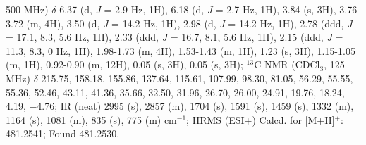 500 MHz) $\delta$ 6.37 (d, \textit{J} = 2.9 Hz, 1H), 6.18 (d, \textit{J} = 2.7 Hz, 1H), 3.84 (s, 3H), 3.76-3.72 (m, 4H),
3.50 (d, \textit{J} = 14.2 Hz, 1H), 2.98 (d, \textit{J} = 14.2 Hz, 1H), 2.78 (ddd, \textit{J} = 17.1, 8.3, 5.6 Hz, 1H), 2.33
(ddd, \textit{J} = 16.7, 8.1, 5.6 Hz, 1H), 2.15 (ddd, \textit{J} = 11.3, 8.3, 0 Hz, 1H), 1.98-1.73 (m, 4H), 1.53-1.43
(m, 1H), 1.23 (s, 3H), 1.15-1.05 (m, 1H), 0.92-0.90 (m, 12H), 0.05 (s, 3H), 0.05 (s, 3H); $^{13}$C
NMR (CDCl$_3$, 125 MHz) $\delta$ 215.75, 158.18, 155.86, 137.64, 115.61, 107.99, 98.30, 81.05, 56.29,
55.55, 55.36, 52.46, 43.11, 41.36, 35.66, 32.50, 31.96, 26.70, 26.00, 24.91, 19.76, 18.24, $-$4.19, $-$4.76; IR (neat) 2995 (s), 2857 (m), 1704 (s), 1591 (s), 1459 (s), 1332 (m), 1164 (s), 1081 (m), 835
(s), 775 (m) cm$^{-1}$; HRMS (ESI+) Calcd. for  [M+H]$^+$: 481.2541; Found 481.2530.

